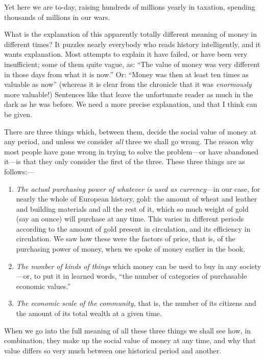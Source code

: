 \documentclass{book}
\begin{document}
Yet here we are to-day, raising hundreds of millions yearly in taxation, spending thousands of millions in our wars.

What is the explanation of this apparently totally different meaning of money in different times? It puzzles nearly everybody who reads history intelligently, and it wants explanation. Most attempts to explain it have failed, or have been very insufficient; some of them quite vague, as: “The value of money was very different in those days from what it is now.” Or: “Money was then at least ten times as valuable as now” (whereas it is clear from the chronicle that it was \emph{enormously} more valuable!) Sentences like that leave the unfortunate reader as much in the dark as he was before. We need a more precise explanation, and that I think can be given.

There are three things which, between them, decide the social value of money at any period, and unless we consider \emph{all} three we shall go wrong. The reason why most people have gone wrong in trying to solve the problem—or have abandoned it—is that they only consider the first of the three. These three things are as follows:—

\begin{enumerate}
	\item \emph{The actual purchasing power of whatever is used as currency}—in our case, for nearly the whole of European history, gold\footnotemark[1]: the amount of wheat and leather and building materials and all the rest of it, which so much weight of gold (say an ounce) will purchase at any time. This varies in different periods according to the amount of gold present in circulation, and its efficiency in circulation. We saw how these were the factors of price, that is, of the purchasing power of money, when we spoke of money earlier in the book.


	\item \emph{The number of kinds of things} which money can be used to buy in any society—or, to put it in learned words, “the number of categories of purchasable economic values.”


	\item \emph{The economic scale of the community,} that is, the number of its citizens and the amount of its total wealth at a given time.



\end{enumerate}
When we go into the full meaning of all these three things we shall see how, in combination, they make up the social value of money at any time, and why that value differs so very much between one historical period and another.
\end{document}
